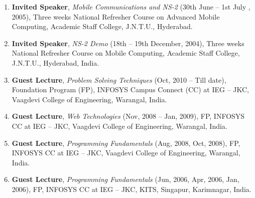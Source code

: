 \begin{enumerate}
\item
\textbf{Invited Speaker}, \textit{Mobile Communications and NS-2} (30th June – 1st  July , 2005), Three weeks National Refresher Course on Advanced Mobile Computing, Academic Staff College, J.N.T.U., Hyderabad.

\item
\textbf{Invited Speaker}, \textit{NS-2 Demo} (18th – 19th December, 2004), Three weeks National Refresher Course on Mobile Computing, Academic Staff College, J.N.T.U., Hyderabad, India.

\item
\textbf{Guest Lecture}, \textit{Problem Solving Techniques} (Oct, 2010 – Till date), Foundation Program (FP), INFOSYS Campus Connect (CC) at IEG – JKC, Vaagdevi College of Engineering, Warangal, India.

\item
\textbf{Guest Lecture}, \textit{Web Technologies} (Nov, 2008 – Jan, 2009), FP, INFOSYS CC at IEG – JKC, Vaagdevi College of Engineering, Warangal, India.

\item
\textbf{Guest Lecture}, \textit{Programming Fundamentals} (Aug, 2008, Oct, 2008), FP, INFOSYS CC at IEG – JKC, Vaagdevi College of Engineering, Warangal, India.

\item
\textbf{Guest Lecture}, \textit{Programming Fundamentals} (Jun, 2006, Apr, 2006, Jan, 2006), FP, INFOSYS CC at IEG – JKC,  KITS, Singapur, Karimnagar, India.



\end{enumerate}